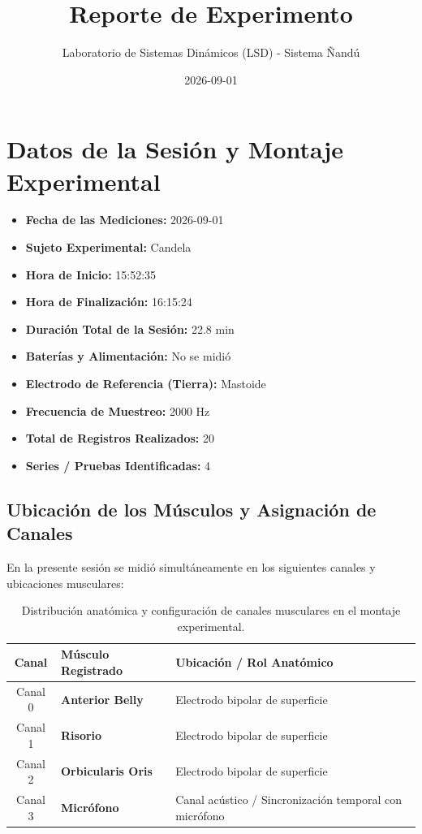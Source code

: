 \documentclass[11pt,a4paper]{article}
\title{\textbf{Reporte de Experimento}}
\author{Laboratorio de Sistemas Dinámicos (LSD) - Sistema Ñandú}
\date{2026-09-01}
\begin{document}
\maketitle

\section{Datos de la Sesión y Montaje Experimental}
\begin{itemize}
    \item \textbf{Fecha de las Mediciones:} 2026-09-01
    \item \textbf{Sujeto Experimental:} Candela
    \item \textbf{Hora de Inicio:} 15:52:35
    \item \textbf{Hora de Finalización:} 16:15:24
    \item \textbf{Duración Total de la Sesión:} 22.8 min
    \item \textbf{Baterías y Alimentación:} No se midió
    \item \textbf{Electrodo de Referencia (Tierra):} Mastoide
    \item \textbf{Frecuencia de Muestreo:} 2000 Hz
    \item \textbf{Total de Registros Realizados:} 20
    \item \textbf{Series / Pruebas Identificadas:} 4
\end{itemize}

\subsection{Ubicación de los Músculos y Asignación de Canales}
En la presente sesión se midió simultáneamente en los siguientes canales y ubicaciones musculares:
\begin{table}[H]
\centering
\begin{tabularx}{\textwidth}{c p{6.5cm} X}
\toprule
\textbf{Canal} & \textbf{Músculo Registrado} & \textbf{Ubicación / Rol Anatómico} \\
\midrule
Canal 0 & \textbf{Anterior Belly} & Electrodo bipolar de superficie \\
Canal 1 & \textbf{Risorio} & Electrodo bipolar de superficie \\
Canal 2 & \textbf{Orbicularis Oris} & Electrodo bipolar de superficie \\
Canal 3 & \textbf{Micrófono} & Canal acústico / Sincronización temporal con micrófono \\
\bottomrule
\end{tabularx}
\caption{Distribución anatómica y configuración de canales musculares en el montaje experimental.}
\end{table}
\end{document}
